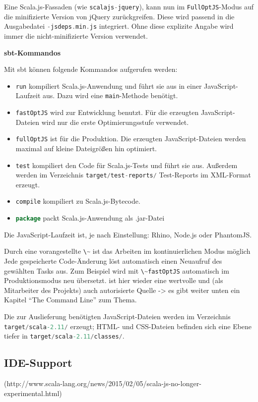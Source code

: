 \documentclass[a4paper, 12pt, hidelinks, listof=totoc, listoftables=totoc, bibliography=totoc]{scrreprt}
\newcommand{\code}[1]{\lstinline[language=Scala, style=inline]|#1|}
\newcommand{\MyMiniSec}[1]{\rmfamily\fontsize{12}{15}\selectfont
	\vspace{7pt}\textbf{#1} %
}
\begin{document}
Eine Scala.js-Fassaden (wie \code{scalajs-jquery}), kann nun im \code{FullOptJS}-Modus auf die minifizierte Version von jQuery zurückgreifen. Diese wird passend in die Ausgabedatei \mbox{\code{-jsdeps.min.js}} integriert. Ohne diese explizite Angabe wird immer die nicht-minifizierte Version verwendet.


\MyMiniSec{sbt-Kommandos}

Mit sbt können folgende Kommandos aufgerufen werden:

\begin{itemize}
\item \code{run} kompiliert Scala.js-Anwendung und führt sie aus in einer JavaScript-Laufzeit aus. Dazu wird eine \code{main}-Methode benötigt.
\item \code{fastOptJS} wird zur Entwicklung benutzt. Für die erzeugten JavaScript-Dateien wird nur die erste Optimierungsstufe verwendet.
\item \code{fullOptJS} ist für die Produktion. Die erzeugten JavaScript-Dateien werden maximal auf kleine Dateigrößen hin optimiert.
\item \code{test} kompiliert den Code für Scala.js-Tests und führt sie aus. Außerdem werden im Verzeichnis \code{target/test-reports/} Test-Reports im \ac{XML}-Format erzeugt.
\item \code{compile} kompiliert zu Scala.js-Bytecode.
\item \code{package} packt Scala.js-Anwendung als .jar-Datei
\end{itemize}

Die JavaScript-Laufzeit ist, je nach Einstellung: Rhino, Node.js oder PhantomJS.

Durch eine vorangestellte \code{\~} ist das Arbeiten im kontinuierlichen Modus möglich
Jede gespeicherte Code-Änderung löst automatisch einen Neuaufruf des gewählten Tasks aus. Zum Beispiel wird mit \code{\~fastOptJS} automatisch im Produktionsmodus neu übersetzt. \cite[\#TheCommandLine]{haoyi.HOS} ist hier wieder eine wertvolle und (als Mitarbeiter des Projekts) auch autorisierte Quelle -> es gibt weiter unten ein Kapitel "`The Command Line"' zum Thema.

Die zur Auslieferung benötigten JavaScript-Dateien werden im Verzeichnis \code{target/scala-2.11/} erzeugt; \ac{HTML}- und \ac{CSS}-Dateien befinden sich eine Ebene tiefer in \code{target/scala-2.11/classes/}.



\subsection{IDE-Support}\label{subsec:sjs-ide}
(http://www.scala-lang.org/news/2015/02/05/scala-js-no-longer-experimental.html)
\end{document}

